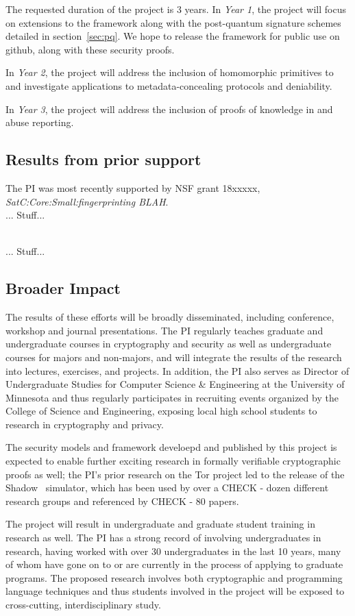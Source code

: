 The requested duration of the project is 3 years.  In {\em Year 1}, the project will focus on extensions to the \vcvio framework along with the post-quantum signature schemes detailed in section~\ref{sec:pq}.  We hope to release the framework for public use on github, along with these security proofs.

In {\em Year 2}, the project will address the inclusion of homomorphic primitives to \vcvio and investigate applications to metadata-concealing protocols and deniability.

In {\em Year 3}, the project will address the inclusion of proofs of knowledge in \vcvio and abuse reporting.

\subsection{Results from prior support}

The PI was most recently supported by NSF grant 18xxxxx, {\em SatC:Core:Small:fingerprinting BLAH}.
\\

... Stuff...

\\
... Stuff...

\subsection{Broader Impact}
The results of these efforts will be broadly disseminated, including
conference, workshop and journal presentations.  The PI regularly
teaches graduate and undergraduate courses in cryptography and security as well as undergraduate courses for majors and non-majors, and will integrate the results of the research into lectures, exercises, and projects. In addition, the PI also serves as Director of Undergraduate Studies for Computer Science \& Engineering at the University of Minnesota and thus regularly participates in recruiting events organized by the College of Science and Engineering, exposing local high school students to research in cryptography and privacy.

The security models and framework develoepd and published by this project is expected to enable further exciting research in formally verifiable cryptographic proofs as well; the PI's prior research on the Tor project led to the release of the Shadow~\cite{jansen2012shadow} simulator, which has been used by over a CHECK - dozen different research groups and referenced by CHECK - 80 papers.

The project will result in undergraduate and graduate student training in research as well.  The PI has a strong record of involving undergraduates in research, having worked with over 30 undergraduates in the last 10 years, many of whom have gone on to or are currently in the process of applying to graduate programs.  The proposed research involves both cryptographic and programming language techniques and thus students involved in the project will be exposed to cross-cutting, interdisciplinary study.


